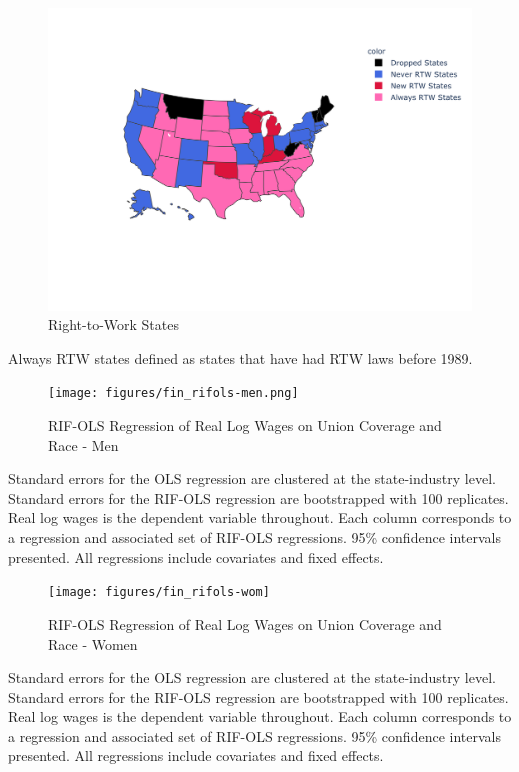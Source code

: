 \documentclass[11pt]{article}
\begin{document}
{\pagebreak
\begin{figure}[h!]
\centering
    \caption{Right-to-Work States}\label{fig:rtwmap}
    \includegraphics[width=\textwidth, height = 0.8\textheight, keepaspectratio]{figures/rtwmap.png}
\end{figure}
\footnotesize{Always RTW states defined as states that have had RTW laws before 1989.}

\pagebreak
\begin{landscape}
\begin{figure}[ht!]
\centering
    \caption{RIF-OLS Regression of Real Log Wages on Union Coverage and Race - Men}\label{fig:rifols-men}
    \texttt{[image: figures/fin\_rifols-men.png]}
\end{figure}
\footnotesize{Standard errors for the OLS regression are clustered at the state-industry level. Standard errors for the RIF-OLS regression are bootstrapped with 100 replicates. Real log wages is the dependent variable throughout. Each column corresponds to a regression and associated set of RIF-OLS regressions. 95\% confidence intervals presented. All regressions include covariates and fixed effects.}
\end{landscape}

\pagebreak
\begin{landscape}
\begin{figure}[ht!]
\centering
    \caption{RIF-OLS Regression of Real Log Wages on Union Coverage and Race - Women}\label{fig:rifols-wom}
    \texttt{[image: figures/fin\_rifols-wom]}
\end{figure}
\footnotesize{Standard errors for the OLS regression are clustered at the state-industry level. Standard errors for the RIF-OLS regression are bootstrapped with 100 replicates. Real log wages is the dependent variable throughout. Each column corresponds to a regression and associated set of RIF-OLS regressions. 95\% confidence intervals presented. All regressions include covariates and fixed effects.}
\end{landscape}

}
\end{document}
